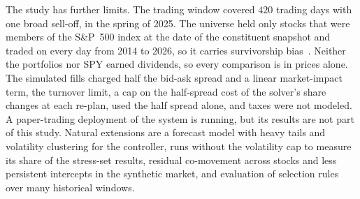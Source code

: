 The study has further limits. The trading window covered $420$ trading days with one broad sell-off, in the spring
of 2025. The universe held only stocks that were members of the S\&P~500 index at the date of the constituent
snapshot and traded on every day from 2014 to 2026, so it carries survivorship bias~\cite{brownEtAl1992}. Neither
the portfolios nor SPY earned dividends, so every comparison is in prices alone. The simulated fills charged half the
bid-ask spread and a linear market-impact term, the turnover limit, a cap on the half-spread cost of the solver's share changes at each re-plan, used the half spread alone, and taxes were not
modeled. A paper-trading deployment of the system is running, but its results are not part of this study. Natural
extensions are a forecast model with heavy tails and volatility clustering for the controller, runs without the volatility cap to measure its share of the stress-set results, residual
co-movement across stocks and less persistent intercepts in the synthetic market, and evaluation of selection rules
over many historical windows.
